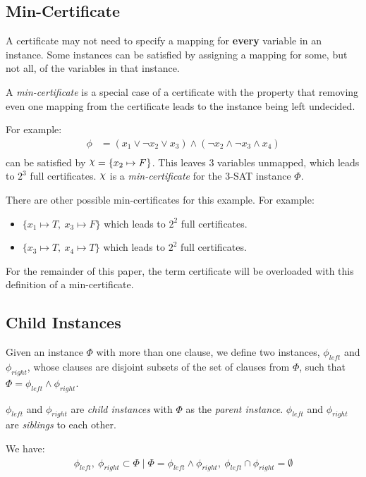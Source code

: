 \subsection*{Min-Certificate}

A certificate may not need to specify a mapping for \textbf{every} variable in an instance.
Some instances can be satisfied by assigning a mapping for some, but not all, of the variables in that instance.

A \textit{min-certificate} is a special case of a certificate with the property that removing even one mapping from the certificate leads to the instance being left undecided.

For example:
\begin{align*}
    \phi & = (x_1 \lor \lnot x_2 \lor x_3) \land (\lnot x_2 \land \lnot x_3 \land x_4) \\
\end{align*}
can be satisfied by $ \rchi = \{ x_2 \mapsto F \} $.
This leaves $3$ variables unmapped, which leads to $2^3$ full certificates.
$\rchi$ is a \textit{min-certificate} for the 3-SAT instance $\Phi$.

There are other possible min-certificates for this example.
For example:
\begin{itemize}
    \item $\{ x_1 \mapsto T,~ x_3 \mapsto F \}$ which leads to $2^2$ full certificates.
    \item $\{ x_3 \mapsto T,~ x_4 \mapsto T \}$ which leads to $2^2$ full certificates.
\end{itemize}

For the remainder of this paper, the term certificate will be overloaded with this definition of a min-certificate.


\subsection*{Child Instances}

Given an instance $\Phi$ with more than one clause, we define two instances, $\phi_{left}$ and $\phi_{right}$, whose clauses are disjoint subsets of the set of clauses from $\Phi$, such that $\Phi = \phi_{left} \land \phi_{right}$.

$\phi_{left}$ and $\phi_{right}$ are \textit{child instances} with $\Phi$ as the \textit{parent instance}.
$\phi_{left}$ and $\phi_{right}$ are \textit{siblings} to each other.

We have:
\begin{align*}
    \phi_{left},~ \phi_{right} \subset \Phi
    \mid \Phi = \phi_{left} \land \phi_{right},~
    \phi_{left} \cap \phi_{right} = \emptyset
\end{align*}

